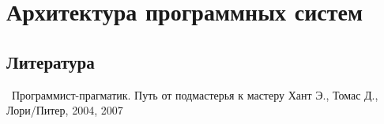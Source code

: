 \chapter{Архитектура программных систем}

\section{Литература}

\cite{proghant}\ Программист-прагматик. Путь от подмастерья к мастеру
Хант Э., Томас Д., Лори/Питер, 2004, 2007



